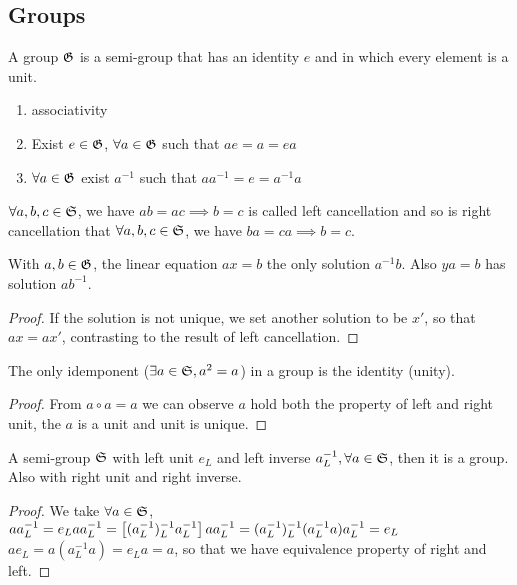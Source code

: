 	\subsection{Groups}
		\begin{definition}\label{defGroup}
		A group $\group$ is a semi-group that has an identity $e$ and in which every element is a unit.
		\begin{enumerate}
		\item associativity
		\item Exist $e\in\group$, $\forall a\in\group$ such that $ae=a=ea$
		\item $\forall a\in\group$ exist $a^{-1}$ such that $aa^{-1}=e=a^{-1}a$
		\end{enumerate}
		\end{definition}
		\begin{definition}
		$\forall a,b,c\in\semiG$, we have $ab=ac\implies b=c$ is called left cancellation and so is right cancellation that $\forall a,b,c\in\semiG$, we have $ba=ca\implies b=c$.
		\end{definition}
		\begin{theorem}\label{eqingroup}
		With $a,b\in\group$, the linear equation $ax=b$ the only solution $a^{-1}b$. Also $ya=b$ has solution $ab^{-1}$.
		\end{theorem}
		\begin{proof}
		If the solution is not unique, we set another solution to be $x'$, so that $ax=ax'$, contrasting to the result of left cancellation.
		\end{proof}
		\begin{theorem}
		The only idemponent ($\exists a\in\semiG, a^2=a$) in a group is the identity (unity).
		\end{theorem}
		\begin{proof}
		From $a\circ a=a$ we can observe $a$ hold both the property of left and right unit, the $a$ is a unit and unit is unique.
		\end{proof}
		\begin{theorem}
		A semi-group $\semiG$ with left unit $e_L$ and left inverse $a^{-1}_L, \forall a\in\semiG$, then it is a group. Also with right unit and right inverse.
		\end{theorem}
		\begin{proof}
		We take $\forall a\in\semiG$, $aa^{-1}_L=e_Laa^{-1}_L=\lr[]{(a^{-1}_L)^{-1}_La^{-1}_L}aa^{-1}_L=(a^{-1}_L)^{-1}_L(a^{-1}_La)a^{-1}_L=e_L$\\
		$ae_L=a(a^{-1}_La)=e_La=a$, so that we have equivalence property of right and left. 
		\end{proof}
